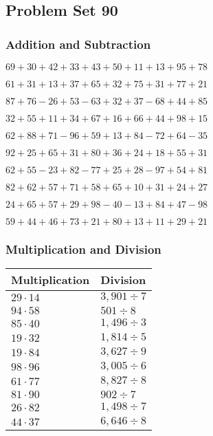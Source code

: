 \hypertarget{problem-set-90}{%
\subsection{Problem Set 90}\label{problem-set-90}}

\hypertarget{addition-and-subtraction}{%
\subsubsection{Addition and
Subtraction}\label{addition-and-subtraction}}

\(69+30+42+33+43+50+11+13+95+78\)

\(61+31+13+37+65+32+75+31+77+21\)

\(87+76-26+53-63+32+37-68+44+85\)

\(32+55+11+34+67+16+66+44+98+15\)

\(62+88+71-96+59+13+84-72+64-35\)

\(92+25+65+31+80+36+24+18+55+31\)

\(62+55-23+82-77+25+28-97+54+81\)

\(82+62+57+71+58+65+10+31+24+27\)

\(24+65+57+29+98-40-13+84+47-98\)

\(59+44+46+73+21+80+13+11+29+21\)

\hypertarget{multiplication-and-division}{%
\subsubsection{Multiplication and
Division}\label{multiplication-and-division}}

\begin{longtable}[]{@{}ll@{}}
\toprule
Multiplication & Division\tabularnewline
\midrule
\endhead
\(29\cdot14\) & \(3,901÷7\)\tabularnewline
\(94\cdot58\) & \(501÷8\)\tabularnewline
\(85\cdot40\) & \(1,496÷3\)\tabularnewline
\(19\cdot32\) & \(1,814÷5\)\tabularnewline
\(19\cdot84\) & \(3,627÷9\)\tabularnewline
\(98\cdot96\) & \(3,005÷6\)\tabularnewline
\(61\cdot77\) & \(8,827÷8\)\tabularnewline
\(81\cdot90\) & \(902÷7\)\tabularnewline
\(26\cdot82\) & \(1,498÷7\)\tabularnewline
\(44\cdot37\) & \(6,646÷8\)\tabularnewline
\bottomrule
\end{longtable}
